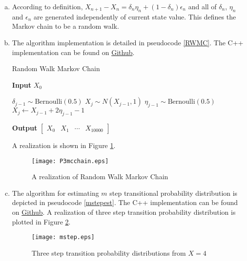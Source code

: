 \documentclass[12pt]{article}
\begin{document}
\begin{enumerate}[(a)]
	\item According to definition, $X_{n+1} - X_{n} = \delta_n \eta_n + (1-\delta_n) \epsilon_n$ and all of $\delta_n$, $\eta_n$ and $\epsilon_n$ are generated independently of current state value. This defines the Markov chain to be a random walk.
	
	\item The algorithm implementation is detailed in pseudocode \ref{RWMC}. The C++ implementation can be found on \href{https://github.com/mkbwang/BIOSTAT882/blob/master/HW1/P3.cpp}{Github}.
	\begin{algorithm}
		\caption{Random Walk Markov Chain}\label{RWMC}
		\hspace*{\algorithmicindent} \textbf{Input} $X_0$
		\begin{algorithmic}[1]
			\State $\delta_{j-1} \sim \text{Bernoulli}(0.5)$
			\State $X_j \sim N(X_{j-1}, 1)$
			\Else
			\State $\eta_{j-1} \sim \text{Bernoulli}(0.5)$
			\State $X_j \gets X_{j-1} + 2\eta_{j-1} - 1$
			\EndIf
			\EndFor
		\end{algorithmic}
		\hspace*{\algorithmicindent} \textbf{Output} $\begin{bmatrix}X_0 & X_1 & \cdots &X_{10000} \end{bmatrix}$
	\end{algorithm}

	A realization is shown in Figure \ref{rwmcchain}.
	\begin{figure}[htbp]
		\centering
		\texttt{[image: P3mcchain.eps]}
		\caption{A realization of Random Walk Markov Chain}\label{rwmcchain}
	\end{figure}
	\item 
	
	The algorithm for estimating $m$ step transitional probability distribution is depicted in pseudocode \ref{mstepest}. The C++ implementation can be found on \href{https://github.com/mkbwang/BIOSTAT882/blob/master/HW1/P3.cpp}{Github}. A realization of three step transition probability distribution is plotted in Figure \ref{mstepplot}.
	\begin{figure}[htbp]
		\centering
		\texttt{[image: mstep.eps]}
		\caption{Three step transition probability distributions from $X=4$}\label{mstepplot}
	\end{figure}
\end{enumerate}
\end{document}
